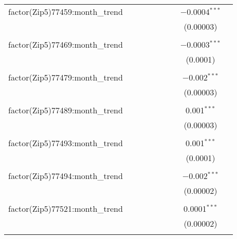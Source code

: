 \begin{table}[H]
{\begin{tabular}{@{\extracolsep{5pt}}lcccccccc}
  factor(Zip5)77459:month\_trend &  &  &  &  &  &  & $-$0.0004$^{***}$ &  \\  

   &  &  &  &  &  &  & (0.00003) &  \\  

   & & & & & & & & \\  

  factor(Zip5)77469:month\_trend &  &  &  &  &  &  & $-$0.0003$^{***}$ &  \\  

   &  &  &  &  &  &  & (0.0001) &  \\  

   & & & & & & & & \\  

  factor(Zip5)77479:month\_trend &  &  &  &  &  &  & $-$0.002$^{***}$ &  \\  

   &  &  &  &  &  &  & (0.00003) &  \\  

   & & & & & & & & \\  

  factor(Zip5)77489:month\_trend &  &  &  &  &  &  & 0.001$^{***}$ &  \\  

   &  &  &  &  &  &  & (0.00003) &  \\  

   & & & & & & & & \\  

  factor(Zip5)77493:month\_trend &  &  &  &  &  &  & 0.001$^{***}$ &  \\  

   &  &  &  &  &  &  & (0.0001) &  \\  

   & & & & & & & & \\  

  factor(Zip5)77494:month\_trend &  &  &  &  &  &  & $-$0.002$^{***}$ &  \\  

   &  &  &  &  &  &  & (0.00002) &  \\  

   & & & & & & & & \\  

  factor(Zip5)77521:month\_trend &  &  &  &  &  &  & 0.0001$^{***}$ &  \\  

   &  &  &  &  &  &  & (0.00002) &  \\  

   & & & & & & & & \\  


\end{tabular}}
\end{table}
